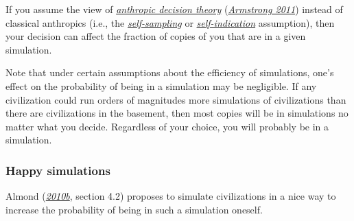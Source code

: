 If you assume the view of
\href{https://www.youtube.com/watch?v=aiGOGkBiWEo}{\emph{anthropic
decision theory}}
(\href{https://arxiv.org/abs/1110.6437}{\emph{Armstrong 2011}}) instead
of classical anthropics (i.e., the
\href{https://en.wikipedia.org/wiki/Self-sampling_assumption}{\emph{self-sampling}}
or
\href{https://en.wikipedia.org/wiki/Self-indication_assumption}{\emph{self-indication}}
assumption), then your decision can affect the fraction of copies of you
that are in a given simulation.

Note that under certain assumptions about the efficiency of simulations,
one's effect on the probability of being in a simulation may be
negligible. If any civilization could run orders of magnitudes more
simulations of civilizations than there are civilizations in the
basement, then most copies will be in simulations no matter what you
decide. Regardless of your choice, you will probably be in a simulation.

\subsubsection{Happy simulations}\label{happy-simulations}

Almond
(\href{https://web.archive.org/web/20120310010225/http://www.paul-almond.com/Correlation2.pdf}{\emph{2010b}},
section 4.2) proposes to simulate civilizations in a nice way to
increase the probability of being in such a simulation oneself.


